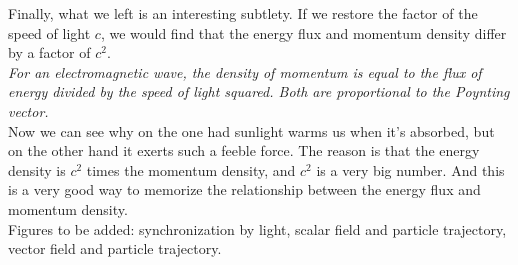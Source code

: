 \documentclass{article}
\newcommand{\1}{\left}
\newcommand{\2}{\right}
\begin{document}
Finally, what we left is an interesting subtlety. If we restore the factor of the speed of light $c$, we would find that the energy flux and momentum density differ by a factor of $c^2$.\\ 

\textit{For an electromagnetic wave, the density of momentum is equal to the flux of energy divided by the speed of light squared. Both are proportional to the Poynting vector.}\\

Now we can see why on the one had sunlight warms us when it's absorbed, but on the other hand it exerts such a feeble force. The reason is that the energy density is $c^2$ times the momentum density, and $c^2$ is a very big number. And this is a very good way to memorize the relationship between the energy flux and momentum density.\\


Figures to be added: synchronization by light,
scalar field and particle trajectory,
vector field and particle trajectory.
\end{document}

